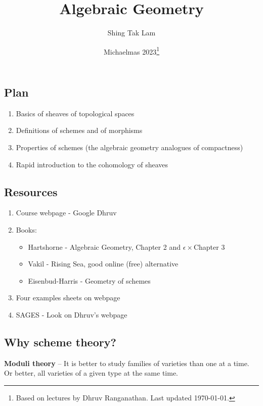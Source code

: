 \documentclass{article}
\title{Algebraic Geometry}
\author{Shing Tak Lam}
\date{Michaelmas 2023\footnote{Based on lectures by Dhruv Ranganathan. Last updated \today.}}
\begin{document}
\maketitle

\tableofcontents

\lec

\subsection{Plan}

\begin{enumerate}
    \item Basics of sheaves of topological spaces
    \item Definitions of schemes and of morphisms
    \item Properties of schemes (the algebraic geometry analogues of compactness)
    \item Rapid introduction to the cohomology of sheaves
\end{enumerate}

\subsection{Resources}

\begin{enumerate}
    \item Course webpage - Google Dhruv
    \item Books:
        \begin{itemize}
            \item Hartshorne - Algebraic Geometry, Chapter 2 and \(\epsilon\times\)Chapter 3
            \item Vakil - Rising Sea, good online (free) alternative
            \item Eisenbud-Harris - Geometry of schemes
        \end{itemize}
    \item Four examples sheets on webpage
    \item SAGES - Look on Dhruv's webpage
\end{enumerate}

\subsection{Why scheme theory?}

\textbf{Moduli theory} -- It is better to study families of varieties than one at a time. Or better, all varieties of a given type at the same time.
\end{document}
